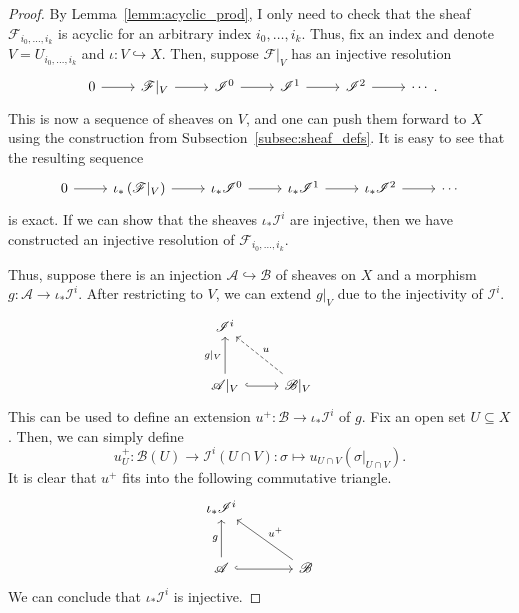 \begin{proof}
  By Lemma~\ref{lemm:acyclic_prod}, I only need to check that the sheaf
  $\mathscr{F}_{i_{0},\ldots,i_{k}}$ is acyclic for an arbitrary index
  $i_{0},\ldots,i_{k}$. Thus, fix an index and denote $V=U_{i_{0},\ldots,i_{k}}$
  and $\iota\colon V\hookrightarrow X$. Then, suppose $\mathscr{F}\vert_{V}$
  has an injective resolution
  \[\begin{tikzcd}
      0\rar & \mathscr{F}\vert_{V}\rar & \mathscr{I}^{0}\rar
      & \mathscr{I}^{1}\rar & \mathscr{I}^{2}\rar & \cdots
    \end{tikzcd}.\]
  This is now a sequence of sheaves on $V$, and one can push them forward
  to $X$ using the construction from Subsection~\ref{subsec:sheaf_defs}.
  It is easy to see that the resulting sequence
  \[\begin{tikzcd}
      0\rar & \iota_\ast\left(\mathscr{F}\vert_{V}\right)\rar
      & \iota_{\ast}\mathscr{I}^{0}\rar
      & \iota_{\ast}\mathscr{I}^{1}\rar
      & \iota_{\ast}\mathscr{I}^{2}\rar & \cdots
    \end{tikzcd}\]
  is exact. If we can show that the sheaves $\iota_{\ast}\mathscr{I}^{i}$
  are injective, then we have constructed an injective resolution of
  $\mathscr{F}_{i_{0},\ldots,i_{k}}$.

  Thus, suppose there is an injection $\mathscr{A}\hookrightarrow\mathscr{B}$
  of sheaves on $X$ and a morphism $g:\mathscr{A}\to\iota_{\ast}\mathscr{I}^{i}$.
  After restricting to $V$, we can extend $g\vert_{V}$ due to the
  injectivity of $\mathscr{I}^{i}$.
  \[\begin{tikzcd}[row sep=large]
      \mathscr{I}^{i} & \\ \mathscr{A}\vert_{V}\uar{g\vert_{V}}\rar[hook]
      & \mathscr{B}\vert_{V}\arrow[ul, dashed, "u"']
    \end{tikzcd}\]
  This can be used to define an extension
  $u^{+}\colon\mathscr{B}\to\iota_{\ast}\mathscr{I}^{i}$ of $g$.
  Fix an open set $U\subseteq X$. Then, we can simply define
  \[
    u^{+}_{U}\colon\mathscr{B}(U)\to\mathscr{I}^{i}(U\cap V)
    :\sigma\mapsto u_{U\cap V}(\sigma\vert_{U\cap V}).
  \]
  It is clear that $u^{+}$ fits into the following commutative triangle.
  \[\begin{tikzcd}[row sep=large, column sep=large]
      \iota_{\ast}\mathscr{I}^{i} & \\ \mathscr{A}\uar{g}\rar[hook]
      & \mathscr{B}\arrow[ul, "u^{+}"']
    \end{tikzcd}\]
  We can conclude that $\iota_{\ast}\mathscr{I}^{i}$ is injective.


\end{proof}
